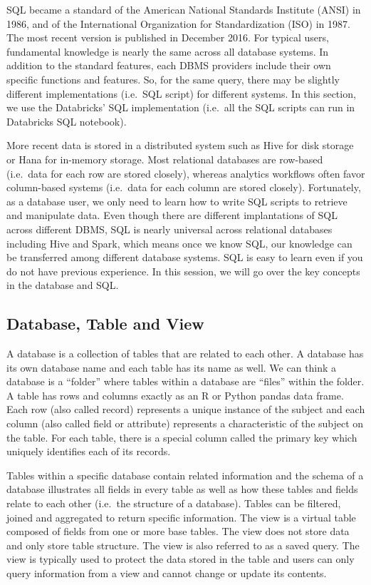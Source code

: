 \documentclass[
  12pt,
]{krantz}
\begin{document}
SQL became a standard of the American National Standards Institute (ANSI) in 1986, and of the International Organization for Standardization (ISO) in 1987. The most recent version is published in December 2016. For typical users, fundamental knowledge is nearly the same across all database systems. In addition to the standard features, each DBMS providers include their own specific functions and features. So, for the same query, there may be slightly different implementations (i.e.~SQL script) for different systems. In this section, we use the Databricks' SQL implementation (i.e.~all the SQL scripts can run in Databricks SQL notebook).

More recent data is stored in a distributed system such as Hive for disk storage or Hana for in-memory storage. Most relational databases are row-based (i.e.~data for each row are stored closely), whereas analytics workflows often favor column-based systems (i.e.~data for each column are stored closely). Fortunately, as a database user, we only need to learn how to write SQL scripts to retrieve and manipulate data. Even though there are different implantations of SQL across different DBMS, SQL is nearly universal across relational databases including Hive and Spark, which means once we know SQL, our knowledge can be transferred among different database systems. SQL is easy to learn even if you do not have previous experience. In this session, we will go over the key concepts in the database and SQL.

\hypertarget{database-table-and-view}{%
\subsection{Database, Table and View}\label{database-table-and-view}}

A database is a collection of tables that are related to each other. A database has its own database name and each table has its name as well. We can think a database is a ``folder'' where tables within a database are ``files'' within the folder. A table has rows and columns exactly as an R or Python pandas data frame. Each row (also called record) represents a unique instance of the subject and each column (also called field or attribute) represents a characteristic of the subject on the table. For each table, there is a special column called the primary key which uniquely identifies each of its records.

Tables within a specific database contain related information and the schema of a database illustrates all fields in every table as well as how these tables and fields relate to each other (i.e.~the structure of a database). Tables can be filtered, joined and aggregated to return specific information. The view is a virtual table composed of fields from one or more base tables. The view does not store data and only store table structure. The view is also referred to as a saved query. The view is typically used to protect the data stored in the table and users can only query information from a view and cannot change or update its contents.
\end{document}
